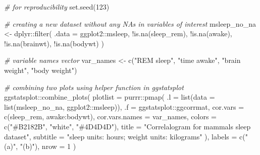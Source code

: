 \documentclass[
]{article}
\newenvironment{Shaded}{\begin{snugshade}}{\end{snugshade}}
\newcommand{\AttributeTok}[1]{\textcolor[rgb]{0.77,0.63,0.00}{#1}}
\newcommand{\CommentTok}[1]{\textcolor[rgb]{0.56,0.35,0.01}{\textit{#1}}}
\newcommand{\DecValTok}[1]{\textcolor[rgb]{0.00,0.00,0.81}{#1}}
\newcommand{\FunctionTok}[1]{\textcolor[rgb]{0.00,0.00,0.00}{#1}}
\newcommand{\NormalTok}[1]{#1}
\newcommand{\OtherTok}[1]{\textcolor[rgb]{0.56,0.35,0.01}{#1}}
\newcommand{\SpecialCharTok}[1]{\textcolor[rgb]{0.00,0.00,0.00}{#1}}
\newcommand{\StringTok}[1]{\textcolor[rgb]{0.31,0.60,0.02}{#1}}
\begin{document}
\begin{Shaded}
\begin{Highlighting}[]
\CommentTok{\# for reproducibility}
\FunctionTok{set.seed}\NormalTok{(}\DecValTok{123}\NormalTok{)}

\CommentTok{\# creating a new dataset without any NAs in variables of interest}
\NormalTok{msleep\_no\_na }\OtherTok{\textless{}{-}}
\NormalTok{  dplyr}\SpecialCharTok{::}\FunctionTok{filter}\NormalTok{(}
    \AttributeTok{.data =}\NormalTok{ ggplot2}\SpecialCharTok{::}\NormalTok{msleep,}
    \SpecialCharTok{!}\FunctionTok{is.na}\NormalTok{(sleep\_rem), }\SpecialCharTok{!}\FunctionTok{is.na}\NormalTok{(awake), }\SpecialCharTok{!}\FunctionTok{is.na}\NormalTok{(brainwt), }\SpecialCharTok{!}\FunctionTok{is.na}\NormalTok{(bodywt)}
\NormalTok{  )}

\CommentTok{\# variable names vector}
\NormalTok{var\_names }\OtherTok{\textless{}{-}} \FunctionTok{c}\NormalTok{(}\StringTok{"REM sleep"}\NormalTok{, }\StringTok{"time awake"}\NormalTok{, }\StringTok{"brain weight"}\NormalTok{, }\StringTok{"body weight"}\NormalTok{)}

\CommentTok{\# combining two plots using helper function in \textasciigrave{}ggstatsplot\textasciigrave{}}
\NormalTok{ggstatsplot}\SpecialCharTok{::}\FunctionTok{combine\_plots}\NormalTok{(}
  \AttributeTok{plotlist =}\NormalTok{ purrr}\SpecialCharTok{::}\FunctionTok{pmap}\NormalTok{(}
    \AttributeTok{.l =} \FunctionTok{list}\NormalTok{(}\AttributeTok{data =} \FunctionTok{list}\NormalTok{(msleep\_no\_na, ggplot2}\SpecialCharTok{::}\NormalTok{msleep)),}
    \AttributeTok{.f =}\NormalTok{ ggstatsplot}\SpecialCharTok{::}\NormalTok{ggcorrmat,}
    \AttributeTok{cor.vars =} \FunctionTok{c}\NormalTok{(sleep\_rem, awake}\SpecialCharTok{:}\NormalTok{bodywt),}
    \AttributeTok{cor.vars.names =}\NormalTok{ var\_names,}
    \AttributeTok{colors =} \FunctionTok{c}\NormalTok{(}\StringTok{"\#B2182B"}\NormalTok{, }\StringTok{"white"}\NormalTok{, }\StringTok{"\#4D4D4D"}\NormalTok{),}
    \AttributeTok{title =} \StringTok{"Correlalogram for mammals sleep dataset"}\NormalTok{,}
    \AttributeTok{subtitle =} \StringTok{"sleep units: hours; weight units: kilograms"}
\NormalTok{  ),}
  \AttributeTok{labels =} \FunctionTok{c}\NormalTok{(}\StringTok{"(a)"}\NormalTok{, }\StringTok{"(b)"}\NormalTok{),}
  \AttributeTok{nrow =} \DecValTok{1}
\NormalTok{)}
\end{Highlighting}
\end{Shaded}
\end{document}
